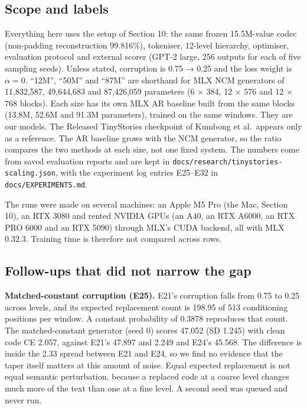 \documentclass[
  british,
]{article}
\begin{document}
\subsection{Scope and labels}\label{scope-and-labels-1}

Everything here uses the setup of Section 10: the same frozen
15.5M-value codec (non-padding reconstruction 99.816\%), tokeniser,
12-level hierarchy, optimiser, evaluation protocol and external scorer
(GPT-2 large, 256 outputs for each of five sampling seeds). Unless
stated, corruption is 0.75 → 0.25 and the loss weight is \(\alpha = 0\).
``12M'', ``50M'' and ``87M'' are shorthand for MLX NCM generators of
11,832,587, 49,644,683 and 87,426,059 parameters (6 × 384, 12 × 576 and
12 × 768 blocks). Each size has its own MLX AR baseline built from the
same blocks (13.8M, 52.6M and 91.3M parameters), trained on the same
windows. They are our models. The Released TinyStories checkpoint of
Kumbong et al.~appears only as a reference. The AR baseline grows with
the NCM generator, so the ratio compares the two methods at each size,
not one fixed system. The numbers come from saved evaluation reports and
are kept in \texttt{docs/research/tinystories-scaling.json}, with the
experiment log entries E25--E32 in \texttt{docs/EXPERIMENTS.md}.

The runs were made on several machines: an Apple M5 Pro (the Mac,
Section 10), an RTX 3080 and rented NVIDIA GPUs (an A40, an RTX A6000,
an RTX PRO 6000 and an RTX 5090) through MLX's CUDA backend, all with
MLX 0.32.3. Training time is therefore not compared across rows.

\subsection{Follow-ups that did not narrow the
gap}\label{follow-ups-that-did-not-narrow-the-gap}

\textbf{Matched-constant corruption (E25).} E21's corruption falls from
0.75 to 0.25 across levels, and its expected replacement count is 198.95
of 513 conditioning positions per window. A constant probability of
0.3878 reproduces that count. The matched-constant generator (seed 0)
scores 47.052 (SD 1.245) with clean code CE 2.057, against E21's 47.897
and 2.249 and E24's 45.568. The difference is inside the 2.33 spread
between E21 and E24, so we find no evidence that the taper itself
matters at this amount of noise. Equal expected replacement is not equal
semantic perturbation, because a replaced code at a coarse level changes
much more of the text than one at a fine level. A second seed was queued
and never run.
\end{document}
